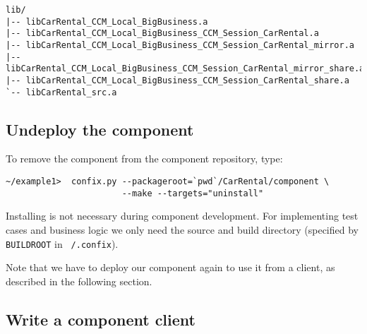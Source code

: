 \begin{small}
\begin{verbatim}
lib/
|-- libCarRental_CCM_Local_BigBusiness.a
|-- libCarRental_CCM_Local_BigBusiness_CCM_Session_CarRental.a
|-- libCarRental_CCM_Local_BigBusiness_CCM_Session_CarRental_mirror.a
|-- libCarRental_CCM_Local_BigBusiness_CCM_Session_CarRental_mirror_share.a
|-- libCarRental_CCM_Local_BigBusiness_CCM_Session_CarRental_share.a
`-- libCarRental_src.a
\end{verbatim}
\end{small}




\subsection{Undeploy the component}

To remove the component from the component repository, type:

\begin{small}
\begin{verbatim}
~/example1>  confix.py --packageroot=`pwd`/CarRental/component \
                       --make --targets="uninstall" 
\end{verbatim}
\end{small}

Installing is not necessary during component development. 
For implementing test cases and business logic we only need the source and
build directory (specified by {\tt BUILDROOT} in {\tt ~/.confix}).
 
Note that we have to deploy our component again to use it from a client,
as described in the following section. 



\newpage
\subsection{Write a component client}

